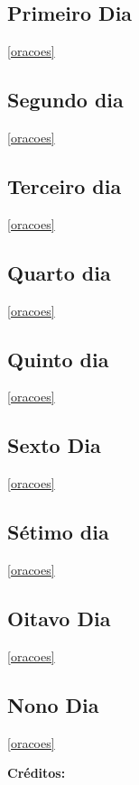 \documentclass[11pt]{article}
\begin{document}
\subsection{Primeiro Dia}
\label{sec:org623c50b}


\ref{oracoes}


\subsection{Segundo dia}
\label{sec:orgc271256}



\ref{oracoes}

\subsection{Terceiro dia}
\label{sec:orga5ef56a}


\ref{oracoes}



\subsection{Quarto dia}
\label{sec:orgd897ea0}


\ref{oracoes}

\subsection{Quinto dia}
\label{sec:org06f47bb}

\ref{oracoes}

\subsection{Sexto Dia}
\label{sec:org47039c5}

\ref{oracoes}

\subsection{Sétimo dia}
\label{sec:orgb33890d}

\ref{oracoes}

\subsection{Oitavo Dia}
\label{sec:org92a7921}

\ref{oracoes}

\subsection{Nono Dia}
\label{sec:org532001e}

\ref{oracoes}




\textbf{Créditos: }
\end{document}
